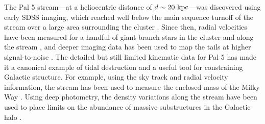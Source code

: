 \documentclass[twocolumn]{aastex63}
\newcommand{\sa}[1]{{\color{teal} SP: #1}}
\begin{document}
The Pal 5 stream---at a heliocentric distance of $d \sim 20~\mathrm{kpc}$---was discovered using early SDSS imaging, which reached well below the main sequence turnoff of the stream over a large area surrounding the cluster \citep{Odenkirchen:2001, Rockosi:2002}.
Since then, radial velocities have been measured for a handful of giant branch stars in the cluster and along the stream \citep{Odenkirchen:2002, Odenkirchen:2009, Ibata:2017}, and deeper imaging data has been used to map the tails at higher signal-to-noise \citep{Bernard:2016, Ibata:2016, Bonaca:2019}.
The detailed but still limited kinematic data for Pal 5 has made it a canonical example of tidal destruction and a useful tool for constraining Galactic structure.
For example, using the sky track and radial velocity information, the stream has been used to measure the enclosed mass of the Milky Way \citep{Kuepper:2015, Bovy:2016}.
Using deep photometry, the density variations along the stream have been used to place limits on the abundance of massive substructures in the Galactic halo \citep{Erkal:2017}.
\end{document}
